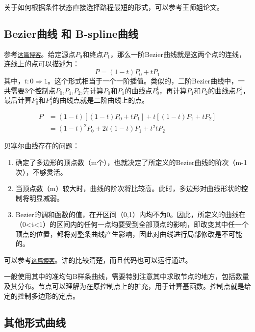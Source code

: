 关于如何根据条件状态直接选择路程最短的形式，可以参考王师姐论文。

\subsection{Bezier曲线 和 B-spline曲线}

参考\href{https://www.cnblogs.com/hnfxs/p/3148483.html}{\texttt{这篇博客}}。给定源点$P_0$和终点$P_1$，那么一阶Bezier曲线就是这两个点的连线，连线上的点可以描述为：
\begin{equation*}
    P = (1-t)P_0 + tP_1
\end{equation*}
其中，$t: 0 \Rightarrow 1$。这个形式相当于一个一阶插值。类似的，二阶Bezier曲线中，一共需要3个控制点$P_0$,$P_1$,$P_2$,先计算$P_0$和$P_1$的曲线点$P_0^1$，再计算$P_1$和$P_2$的曲线点$P_1^1$，最后计算$P_0^1$和$P_1^1$的曲线点就是二阶曲线上的点。

\begin{align*}
    P &= (1-t)\left[(1-t)P_0 + tP_1\right] + t\left[ (1-t)P_1 + tP_2\right] \\
      &= (1-t)^2 P_0 + 2t(1-t)P_1 + t^2 tP_2
\end{align*}

贝塞尔曲线存在的问题：
\begin{enumerate}
	\item 确定了多边形的顶点数（m个），也就决定了所定义的Bezier曲线的阶次（m-1次），不够灵活。
    \item 当顶点数（m）较大时，曲线的阶次将比较高。此时，多边形对曲线形状的控制将明显减弱。    
    \item Bezier的调和函数的值，在开区间（0,1）内均不为0。因此，所定义的曲线在（0<t<1）的区间内的任何一点均要受到全部顶点的影响，即改变其中任一个顶点的位置，都将对整条曲线产生影响，因此对曲线进行局部修改是不可能的。
\end{enumerate}


可以参考\href{https://blog.csdn.net/Mr_Grit/article/details/45603627}{\texttt{这篇博客}}。讲的比较清楚，而且代码也可以运行通过。

一般使用其中的准均匀B样条曲线，需要特别注意其中求取节点的地方，包括数量及其分布。节点可以理解为在原控制点上的扩充，用于计算基函数。控制点就是给定的控制多边形的定点。




\subsection{其他形式曲线}

